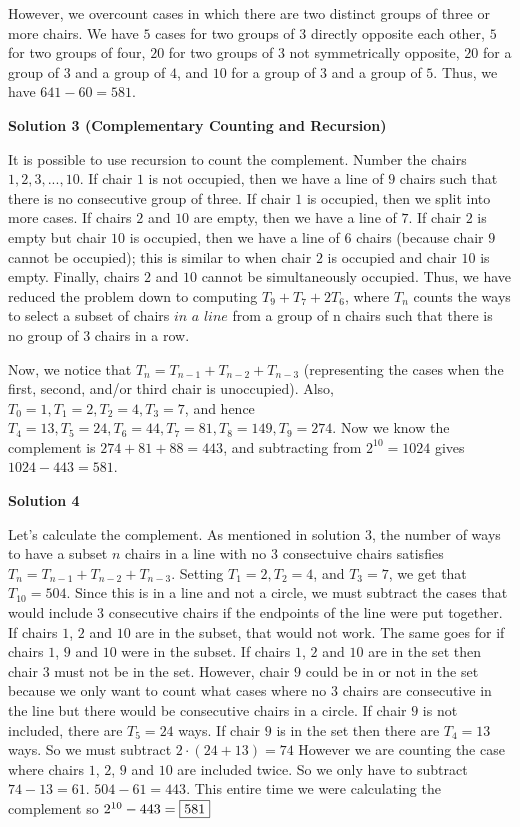 \begin{enumerate}
 However, we overcount cases in which there are two distinct groups of three or more chairs. We have $5$ cases for two groups of $3$ directly opposite each other, $5$ for two groups of four, $20$ for two groups of $3$ not symmetrically opposite, $20$ for a group of $3$ and a group of $4$, and $10$ for a group of $3$ and a group of $5.$ Thus, we have $641 - 60 = \boxed{581}$.

 



\textbf{Solution 3 (Complementary Counting and Recursion)}

It is possible to use recursion to count the complement. Number the chairs $1, 2, 3, ..., 10.$ If chair $1$ is not occupied, then we have a line of $9$ chairs such that there is no consecutive group of three. If chair $1$ is occupied, then we split into more cases. If chairs $2$ and $10$ are empty, then we have a line of $7.$ If chair $2$ is empty but chair $10$ is occupied, then we have a line of $6$ chairs (because chair $9$ cannot be occupied); this is similar to when chair $2$ is occupied and chair $10$ is empty. Finally, chairs $2$ and $10$ cannot be simultaneously occupied. Thus, we have reduced the problem down to computing $T_9 + T_7 + 2T_6$, where $T_n$ counts the ways to select a subset of chairs $\textit{in a line}$ from a group of n chairs such that there is no group of $3$ chairs in a row.

 Now, we notice that $T_n = T_{n-1} + T_{n-2} + T_{n-3}$ (representing the cases when the first, second, and/or third chair is unoccupied). Also, $T_0 = 1, T_1 = 2, T_2 = 4, T_3 = 7$, and hence $T_4 = 13, T_5 = 24, T_6 = 44, T_7 = 81, T_8 = 149, T_9 = 274$. Now we know the complement is $274 + 81 + 88 = 443$, and subtracting from $2^{10} = 1024$ gives $1024 - 443 = \boxed{581}$.

 



\textbf{Solution 4}

Let's calculate the complement. As mentioned in solution $3$, the number of ways to have a subset $n$ chairs in a line with no 3 consectuive chairs satisfies $T_n = T_{n-1} + T_{n-2} + T_{n-3}$. Setting $T_{1} = 2, T_{2} = 4$, and $T_{3} = 7$, we get that $T_{10} = 504$. Since this is in a line and not a circle, we must subtract the cases that would include 3 consecutive chairs if the endpoints of the line were put together. If chairs $1$, $2$ and $10$ are in the subset, that would not work. The same goes for if chairs $1$, $9$ and $10$ were in the subset. If chairs $1$, $2$ and $10$ are in the set then chair $3$ must not be in the set. However, chair $9$ could be in or not in the set because we only want to count what cases where no $3$ chairs are consecutive in the line but there would be consecutive chairs in a circle. If chair $9$ is not included, there are $T_{5} = 24$ ways. If chair $9$ is in the set then there are $T_{4} = 13$ ways. So we must subtract $2 \cdot (24 + 13) = 74$ However we are counting the case where chairs $1$, $2$, $9$ and $10$ are included twice. So we only have to subtract $74 - 13 = 61$. $504 - 61 = 443$. This entire time we were calculating the complement so $2^{10} - 443 = \fbox{581}$




\end{enumerate}
